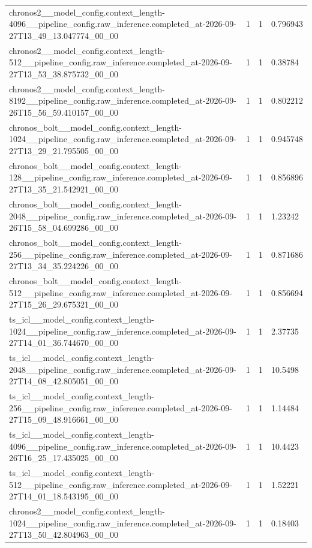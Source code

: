 \begin{tabular}{llll}
chronos2\_\_model\_config.context\_length-4096\_\_pipeline\_config.raw\_inference.completed\_at-2026-09-27T13\_49\_13.047774\_00\_00 & 1 & 1 & 0.796943 \\
chronos2\_\_model\_config.context\_length-512\_\_pipeline\_config.raw\_inference.completed\_at-2026-09-27T13\_53\_38.875732\_00\_00 & 1 & 1 & 0.38784 \\
chronos2\_\_model\_config.context\_length-8192\_\_pipeline\_config.raw\_inference.completed\_at-2026-09-26T15\_56\_59.410157\_00\_00 & 1 & 1 & 0.802212 \\
chronos\_bolt\_\_model\_config.context\_length-1024\_\_pipeline\_config.raw\_inference.completed\_at-2026-09-27T13\_29\_21.795505\_00\_00 & 1 & 1 & 0.945748 \\
chronos\_bolt\_\_model\_config.context\_length-128\_\_pipeline\_config.raw\_inference.completed\_at-2026-09-27T13\_35\_21.542921\_00\_00 & 1 & 1 & 0.856896 \\
chronos\_bolt\_\_model\_config.context\_length-2048\_\_pipeline\_config.raw\_inference.completed\_at-2026-09-26T15\_58\_04.699286\_00\_00 & 1 & 1 & 1.23242 \\
chronos\_bolt\_\_model\_config.context\_length-256\_\_pipeline\_config.raw\_inference.completed\_at-2026-09-27T13\_34\_35.224226\_00\_00 & 1 & 1 & 0.871686 \\
chronos\_bolt\_\_model\_config.context\_length-512\_\_pipeline\_config.raw\_inference.completed\_at-2026-09-27T15\_26\_29.675321\_00\_00 & 1 & 1 & 0.856694 \\
ts\_icl\_\_model\_config.context\_length-1024\_\_pipeline\_config.raw\_inference.completed\_at-2026-09-27T14\_01\_36.744670\_00\_00 & 1 & 1 & 2.37735 \\
ts\_icl\_\_model\_config.context\_length-2048\_\_pipeline\_config.raw\_inference.completed\_at-2026-09-27T14\_08\_42.805051\_00\_00 & 1 & 1 & 10.5498 \\
ts\_icl\_\_model\_config.context\_length-256\_\_pipeline\_config.raw\_inference.completed\_at-2026-09-27T15\_09\_48.916661\_00\_00 & 1 & 1 & 1.14484 \\
ts\_icl\_\_model\_config.context\_length-4096\_\_pipeline\_config.raw\_inference.completed\_at-2026-09-26T16\_25\_17.435025\_00\_00 & 1 & 1 & 10.4423 \\
ts\_icl\_\_model\_config.context\_length-512\_\_pipeline\_config.raw\_inference.completed\_at-2026-09-27T14\_01\_18.543195\_00\_00 & 1 & 1 & 1.52221 \\
chronos2\_\_model\_config.context\_length-1024\_\_pipeline\_config.raw\_inference.completed\_at-2026-09-27T13\_50\_42.804963\_00\_00 & 1 & 1 & 0.18403 \\

\end{tabular}
